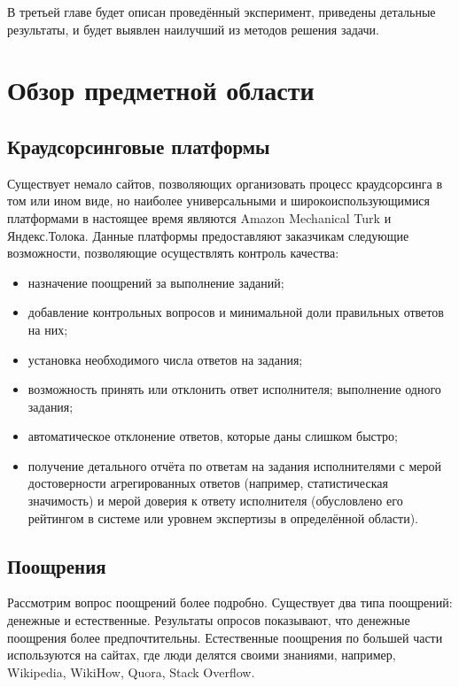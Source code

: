 \documentclass[specification,annotation,times]{itmo-student-thesis}
\begin{document}
В третьей главе будет описан проведённый эксперимент, приведены детальные результаты, и будет выявлен наилучший из методов решения задачи.

\chapter{Обзор предметной области}

\startrelatedwork

\finishrelatedwork

\section{Краудсорсинговые платформы}
Существует немало сайтов, позволяющих организовать процесс краудсорсинга в том или ином виде, но наиболее универсальными и широкоиспользующимися платформами в настоящее время являются Amazon Mechanical Turk и Яндекс.Толока. Данные платформы предоставляют заказчикам следующие возможности, позволяющие осуществлять контроль качества:
\begin{itemize}
    \item назначение поощрений за выполнение заданий;
    \item добавление контрольных вопросов и минимальной доли правильных ответов на них;
    \item установка необходимого числа ответов на задания;
    \item возможность принять или отклонить ответ исполнителя;
    выполнение одного задания;
    \item автоматическое отклонение ответов, которые даны слишком быстро;
    \item получение детального отчёта по ответам на задания исполнителями с мерой достоверности агрегированных ответов (например, статистическая значимость) и мерой доверия к ответу исполнителя (обусловлено его рейтингом в системе или уровнем экспертизы в определённой области).
\end{itemize}

\section{Поощрения}
Рассмотрим вопрос поощрений более подробно. Существует два типа поощрений: денежные и естественные. Результаты опросов показывают, что денежные поощрения более предпочтительны. Естественные поощрения по большей части используются на сайтах, где люди делятся своими знаниями, например, Wikipedia, WikiHow, Quora, Stack Overflow.
\end{document}
